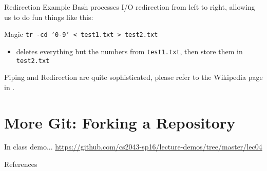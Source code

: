 \documentclass[11pt]{beamer}
\begin{document}
\begin{frame}[fragile]{Redirection Example}
  Bash processes I/O redirection from left to right, allowing us to do fun things like this:

  \begin{block}{Magic}
    \texttt{tr -cd '0-9' < test1.txt > test2.txt}
    \begin{itemize}
      \item deletes everything but the numbers from \texttt{test1.txt}, then store them in \texttt{test2.txt}
    \end{itemize}
  \end{block}

  Piping and Redirection are quite sophisticated, please refer to the Wikipedia page in \cite{wiki}.
\end{frame}
%

%
\section{More Git: Forking a Repository}
\label{sec:more_git_forking_a_repository}

\begin{frame}[fragile]{In class demo...}
  \href{https://github.com/cs2043-sp16/lecture-demos/tree/master/lec04}{https://github.com/cs2043-sp16/lecture-demos/tree/master/lec04}
\end{frame}

%

\begin{frame}[allowframebreaks]{References}
  
  
\end{frame}
\end{document}
